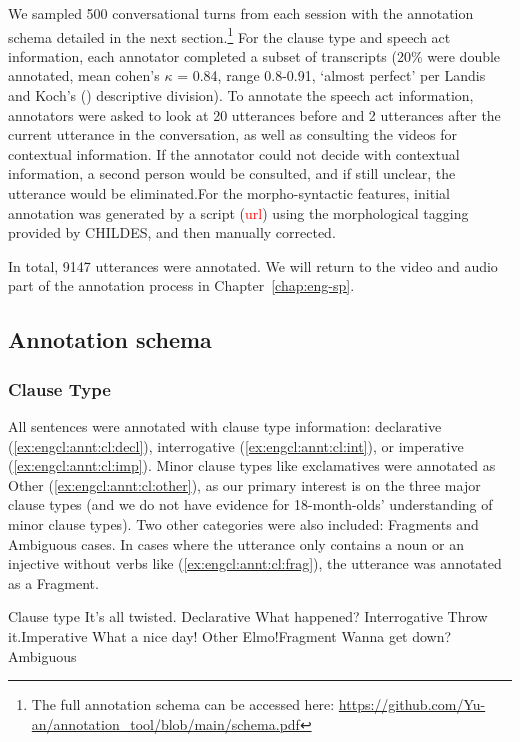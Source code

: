We sampled 500 conversational turns from each session with the annotation schema detailed in the next section.\footnote{The full annotation schema can be accessed here: \url{https://github.com/Yu-an/annotation_tool/blob/main/schema.pdf}} For the clause type and speech act information, each annotator completed a subset of transcripts (20\% were double annotated, mean cohen's $\kappa$ = 0.84, range 0.8-0.91, `almost perfect’ per Landis and Koch's (\cite*{landis1977iaa}) descriptive division). To annotate the speech act information, annotators were asked to look at 20 utterances before and 2 utterances after the current utterance in the conversation, as well as consulting the videos for contextual information. If the annotator could not decide with contextual information, a second person would be consulted, and if still unclear, the utterance would be eliminated.For the morpho-syntactic features, initial annotation was generated by a script (\textcolor{red}{url}) using the morphological tagging provided by CHILDES, and then manually corrected. 

In total, 9147 utterances were annotated. We will return to the video and audio part of the annotation process in Chapter~\ref{chap:eng-sp}.




\subsection{Annotation schema}
\label{sec:engcl:corpus:schema}

\subsubsection{Clause Type}

All sentences were annotated with clause type information: declarative (\ref{ex:engcl:annt:cl:decl}), interrogative (\ref{ex:engcl:annt:cl:int}), or imperative (\ref{ex:engcl:annt:cl:imp}). Minor clause types like exclamatives were annotated as Other (\ref{ex:engcl:annt:cl:other}), as our primary interest is on the three major clause types (and we do not have evidence for 18-month-olds' understanding of minor clause types). Two other categories were also included: Fragments and Ambiguous cases. In cases where the utterance only contains a noun or an injective without verbs like (\ref{ex:engcl:annt:cl:frag}), the utterance was annotated as a Fragment. 

Clause type
\bxl
\label{ex:engcl:annt:cl:decl}
It’s all twisted. \hfill Declarative
\ex \label{ex:engcl:annt:cl:int} What happened?	\hfill Interrogative
\ex \label{ex:engcl:annt:cl:imp} Throw it.\hfill Imperative
\ex \label{ex:engcl:annt:cl:other} What a nice day! \hfill Other
\ex \label{ex:engcl:annt:cl:frag}	Elmo!\hfill	Fragment
\ex \label{ex:engcl:annt:cl:amb} Wanna get down?	\hfill Ambiguous
\exl
\eex


